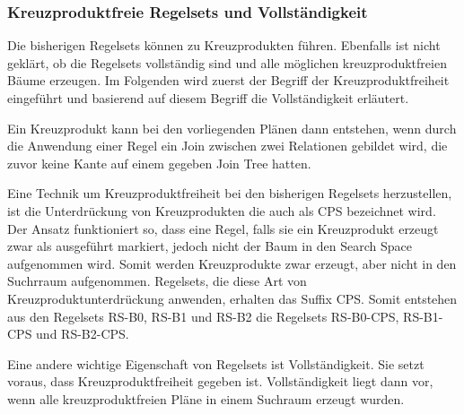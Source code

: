 \subsubsection{Kreuzproduktfreie Regelsets und Vollständigkeit}

Die bisherigen Regelsets können zu Kreuzprodukten führen. Ebenfalls ist nicht geklärt, ob die Regelsets vollständig sind und alle möglichen kreuzproduktfreien Bäume erzeugen. Im Folgenden wird zuerst der Begriff der Kreuzproduktfreiheit eingeführt und basierend auf diesem Begriff die Vollständigkeit erläutert.

Ein Kreuzprodukt kann bei den vorliegenden Plänen dann entstehen, wenn durch die Anwendung einer Regel ein Join zwischen zwei Relationen gebildet wird, die zuvor keine Kante auf einem gegeben Join Tree hatten.

Eine Technik um Kreuzproduktfreiheit bei den bisherigen Regelsets herzustellen, ist die Unterdrückung von Kreuzprodukten die auch als \ac{CPS} bezeichnet wird. Der Ansatz funktioniert so, dass eine Regel, falls sie ein Kreuzprodukt erzeugt zwar als ausgeführt markiert, jedoch nicht der Baum in den Search Space aufgenommen wird. Somit werden Kreuzprodukte zwar erzeugt, aber nicht in den Suchrraum aufgenommen. Regelsets, die diese Art von Kreuzproduktunterdrückung anwenden, erhalten das Suffix CPS. Somit entstehen aus den Regelsets RS-B0, RS-B1 und RS-B2 die Regelsets RS-B0-CPS, RS-B1-CPS und RS-B2-CPS.


Eine andere wichtige Eigenschaft von Regelsets ist Vollständigkeit. Sie setzt voraus, dass Kreuzproduktfreiheit gegeben ist. Vollständigkeit liegt dann vor, wenn alle kreuzproduktfreien Pläne in einem Suchraum erzeugt wurden.


